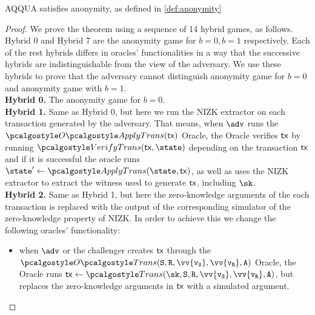 \begin{theorem}
    AQQUA satisfies anonymity, as defined in \autoref{def:anonymity}
\end{theorem}
\begin{proof}
We prove the theorem using a sequence of 14 hybrid games, as follows. Hybrid 0 and Hybrid 7 are the anonymity game for $b=0, b=1$ respectively. Each of the rest hybrids differs in oracles' functionalities in a way that the successive hybrids are indistinguishable from the view of the adversary. We use these hybrids to prove that the adversary cannot distinguish anonymity game for $b=0$ and anonymity game with $b=1$. \\
\textbf{Hybrid 0.} The anonymity game for $b=0$. \\
% 
\textbf{Hybrid 1.} Same as Hybrid 0, but here we run the NIZK extractor on each transaction generated by the adversary. That means, when $\adv$ runs the $\applytxnOracle(\txn)$ Oracle, the Oracle verifies $\textup{\textsf{tx}}$ by running $\vertxn(\txn, \state)$ 
depending on the transaction $\textup{\textsf{tx}}$ and if it is successful the oracle runs $\state^\prime \gets \applytxn(\state, \txn)$, as well as uses the NIZK extractor to extract the witness used to generate $\textup{\textsf{tx}}$, including $\sk$. \\
% 
\textbf{Hybrid 2.} Same as Hybrid 1, but here the zero-knowledge arguments of the each transaction is replaced with the output of the corresponding simulator of the zero-knowledge property of NIZK. In order to achieve this we change the following oracles' functionality:
\begin{itemize} 
    \item when $\adv$ or the challenger creates $\textup{\textsf{tx}}$ through the $\transOracle(\sset, \rset, \vv{\v_\sset}, \vv{\v_\rset}, \anset)$ Oracle, the Oracle runs $\txn \gets \trans(\sk,\sset, \rset, \vv{\v_\sset}, \vv{\v_\rset}, \anset)$, but replaces the zero-knowledge arguments in $\textup{\textsf{tx}}$ with a simulated argument.\\
    

\end{itemize}
\end{proof}
